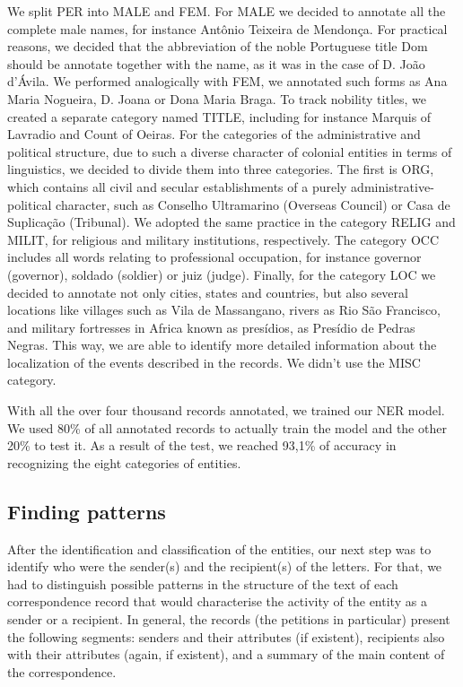 \documentclass{article}
\begin{document}
We split PER into MALE and FEM. For MALE we decided to annotate all the complete male names, for instance Antônio Teixeira de Mendonça. For practical reasons, we decided that the abbreviation of the noble Portuguese title Dom should be annotate together with the name, as it was in the case of D. João d'Ávila. We performed analogically with FEM, we annotated such forms as Ana Maria Nogueira, D. Joana or Dona Maria Braga. To track nobility titles, we created a separate category named TITLE, including for instance Marquis of Lavradio and Count of Oeiras. For the categories of the administrative and political structure, due to such a diverse character of colonial entities in terms of linguistics, we decided to divide them into three categories. The first is ORG, which contains all civil and secular establishments of a purely administrative-political character, such as Conselho Ultramarino (Overseas Council) or Casa de Suplicação (Tribunal). We adopted the same practice in the category RELIG and MILIT, for religious and military institutions, respectively. The category OCC includes all words relating to professional occupation, for instance governor (governor), soldado (soldier) or juiz (judge).  Finally,  for the category LOC we decided to annotate not only cities, states and countries, but also several locations like villages such as Vila de Massangano, rivers as Rio São Francisco, and military fortresses in Africa known as presídios, as Presídio de Pedras Negras. This way, we are able to identify more detailed information about the localization of the events described in the records. We didn’t use the MISC category.

With all the over four thousand records annotated, we trained our NER model. We used 80\% of all annotated records to actually train the model and the other 20\% to test it. As a result of the test, we reached 93,1\% of accuracy in recognizing the eight categories of entities.

\subsection{Finding patterns}

After the identification and classification of the entities, our next step was to identify who were the sender(s) and the recipient(s) of the letters. For that, we had to distinguish possible patterns in the structure of the text of each correspondence record that would characterise the activity of the entity as a sender or a recipient. In general, the records (the petitions in particular) present the following segments: senders and their attributes (if existent), recipients also with their attributes (again, if existent), and a summary of the main content of the correspondence.
\end{document}
